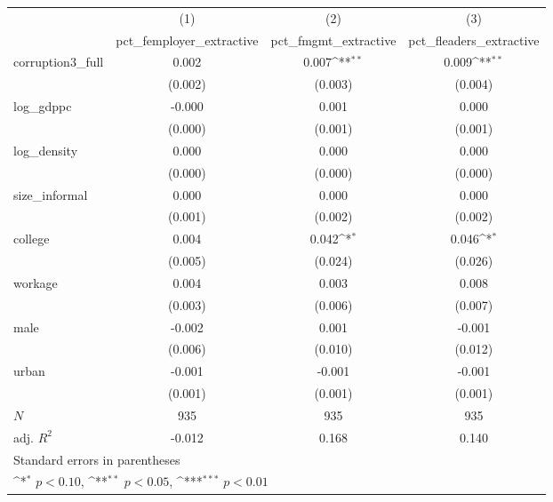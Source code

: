 {
\def\sym#1{\ifmmode^{#1}\else\(^{#1}\)\fi}
\begin{tabular}{l*{3}{c}}
\hline\hline
            &\multicolumn{1}{c}{(1)}&\multicolumn{1}{c}{(2)}&\multicolumn{1}{c}{(3)}\\
            &\multicolumn{1}{c}{pct\_femployer\_extractive}&\multicolumn{1}{c}{pct\_fmgmt\_extractive}&\multicolumn{1}{c}{pct\_fleaders\_extractive}\\
\hline
corruption3\_full&       0.002         &       0.007\sym{**} &       0.009\sym{**} \\
            &     (0.002)         &     (0.003)         &     (0.004)         \\
[1em]
log\_gdppc   &      -0.000         &       0.001         &       0.000         \\
            &     (0.000)         &     (0.001)         &     (0.001)         \\
[1em]
log\_density &       0.000         &       0.000         &       0.000         \\
            &     (0.000)         &     (0.000)         &     (0.000)         \\
[1em]
size\_informal&       0.000         &       0.000         &       0.000         \\
            &     (0.001)         &     (0.002)         &     (0.002)         \\
[1em]
college     &       0.004         &       0.042\sym{*}  &       0.046\sym{*}  \\
            &     (0.005)         &     (0.024)         &     (0.026)         \\
[1em]
workage     &       0.004         &       0.003         &       0.008         \\
            &     (0.003)         &     (0.006)         &     (0.007)         \\
[1em]
male        &      -0.002         &       0.001         &      -0.001         \\
            &     (0.006)         &     (0.010)         &     (0.012)         \\
[1em]
urban       &      -0.001         &      -0.001         &      -0.001         \\
            &     (0.001)         &     (0.001)         &     (0.001)         \\
\hline
\(N\)       &         935         &         935         &         935         \\
adj. \(R^{2}\)&      -0.012         &       0.168         &       0.140         \\
\hline\hline
\multicolumn{4}{l}{\footnotesize Standard errors in parentheses}\\
\multicolumn{4}{l}{\footnotesize \sym{*} \(p<0.10\), \sym{**} \(p<0.05\), \sym{***} \(p<0.01\)}\\
\end{tabular}
}
